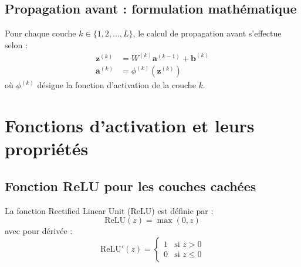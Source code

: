 \documentclass[12pt,a4paper]{report}
\numberwithin{equation}{section}
\begin{document}
\begin{center}
\end{center}

\subsection{Propagation avant : formulation mathématique}

\begin{theorem}
Pour chaque couche $k \in \{1, 2, \ldots, L\}$, le calcul de propagation avant s'effectue selon :
\begin{align}
\mathbf{z}^{(k)} &= W^{(k)} \mathbf{a}^{(k-1)} + \mathbf{b}^{(k)} \label{eq:linear_transform}\\
\mathbf{a}^{(k)} &= \phi^{(k)}(\mathbf{z}^{(k)}) \label{eq:activation_function}
\end{align}
où $\phi^{(k)}$ désigne la fonction d'activation de la couche $k$.
\end{theorem}

\section{Fonctions d'activation et leurs propriétés}

\subsection{Fonction ReLU pour les couches cachées}

\begin{definition}
La fonction Rectified Linear Unit (ReLU) est définie par :
$$\text{ReLU}(z) = \max(0, z)$$
avec pour dérivée :
$$\text{ReLU}'(z) = \begin{cases}
1 & \text{si } z > 0\\
0 & \text{si } z \leq 0
\end{cases}$$
\end{definition}
\end{document}

